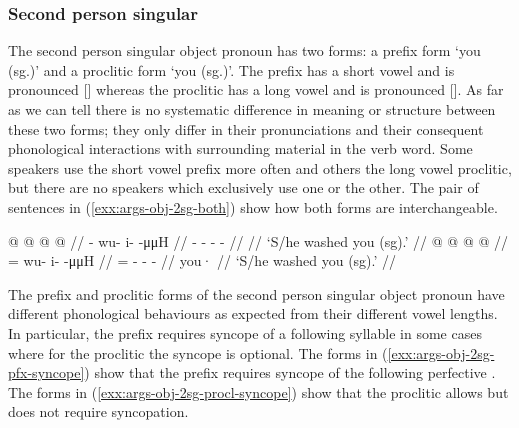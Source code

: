 
\subsubsection{Second person singular}\label{sec:args-obj-2sg}

The second person singular object pronoun has two forms: a prefix form  ‘you (sg.)’ and a proclitic form  ‘you (sg.)’. The prefix  has a short vowel and is pronounced [] whereas the proclitic  has a long vowel and is pronounced []. As far as we can tell there is no systematic difference in meaning or structure between these two forms; they only differ in their pronunciations and their consequent phonological interactions with surrounding material in the verb word. Some speakers use the short vowel prefix more often and others the long vowel proclitic, but there are no speakers which exclusively use one or the other. The pair of sentences in (\ref{exx:args-obj-2sg-both}) show how both forms are interchangeable.

\pex\label{exx:args-obj-2sg-both}%
\a\label{exx:args-obj-2sg-both-prefix}%
%
\begingl
	\gla	{} @ {} @ {} @ {} @ {} //
	\glb	{}- wu- i-  -μμH //
	\glc	{}- - -  - //
	\gld	{} {} {} {} {} //
	\glft	‘S/he washed you (sg).’
		//
\endgl
\a\label{exx:args-obj-2sg-both-proclitic}%
%
\begingl
	\gla	{} @  @ {} @ {} @ {} //
	\glb	{}= wu- i-  -μμH //
	\glc	{}= - -  - //
	\gld	you·  {} {} {} //
	\glft	‘S/he washed you (sg).’
		//
\endgl
\xe

The prefix and proclitic forms of the second person singular object pronoun have different phonological behaviours as expected from their different vowel lengths. In particular, the prefix requires syncope of a following syllable in some cases where for the proclitic the syncope is optional. The forms in (\ref{exx:args-obj-2sg-pfx-syncope}) show that the prefix  requires syncope of the following perfective . The forms in (\ref{exx:args-obj-2sg-procl-syncope}) show that the proclitic  allows but does not require syncopation.


